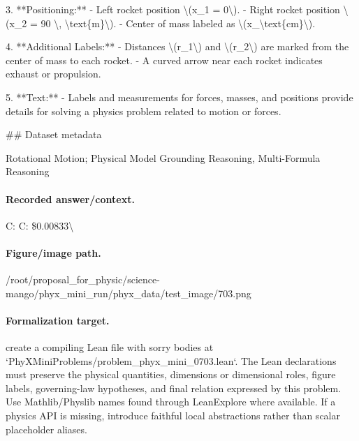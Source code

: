 3. **Positioning:**
   - Left rocket position \textbackslash{}(x\_1 = 0\textbackslash{}).
   - Right rocket position \textbackslash{}(x\_2 = 90 \textbackslash{}, \textbackslash{}text\{m\}\textbackslash{}).
   - Center of mass labeled as \textbackslash{}(x\_\textbackslash{}text\{cm\}\textbackslash{}).

4. **Additional Labels:**
   - Distances \textbackslash{}(r\_1\textbackslash{}) and \textbackslash{}(r\_2\textbackslash{}) are marked from the center of mass to each rocket.
   - A curved arrow near each rocket indicates exhaust or propulsion.

5. **Text:**
   - Labels and measurements for forces, masses, and positions provide details for solving a physics problem related to motion or forces.

\#\# Dataset metadata

Rotational Motion; Physical Model Grounding Reasoning, Multi-Formula Reasoning

\paragraph{Recorded answer/context.}
C: C: \$0.00833\textbackslash{}

\paragraph{Figure/image path.}
/root/proposal\_for\_physic/science-mango/phyx\_mini\_run/phyx\_data/test\_image/703.png

\paragraph{Formalization target.}
create a compiling Lean file with sorry bodies at `PhyXMiniProblems/problem\_phyx\_mini\_0703.lean`. The Lean declarations must preserve the physical quantities, dimensions or dimensional roles, figure labels, governing-law hypotheses, and final relation expressed by this problem.
Use Mathlib/Physlib names found through LeanExplore where available. If a physics API is missing, introduce faithful local abstractions rather than scalar placeholder aliases.

